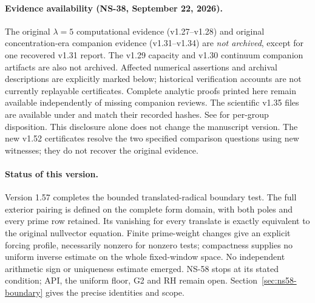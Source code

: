 \documentclass[11pt]{article}
\theoremstyle{remark}
\begin{document}
\begin{abstract}
experiment is inexpensive, but a bounded shift retains the exponential
cost of the present scalar far comparison. No cofinal floor follows.
Two precise meta-obstructions identify additional information that a
successful cofinal estimate must retain. The optimal full-distribution
mass-cap relaxation, and even the displayed mass/height/variation
relaxation, have divergent negative budgets for the actual symbol.
A separate domain-preserving unitary construction shows that exact
finite head and source-action data do not rescue a bound blind to
spectral orientation. These are scoped impossibility theorems, not a
claim that all recorded closures share one hypothesis.
Strong cancellation persists in the exact
source complement. Every complete eigenfunction has zero physical
endpoint. A cofinal complete-Weil lower error tending to zero would
imply RH directly, but remains unproved.
\end{abstract}
\paragraph{Evidence availability (NS-38, September 22, 2026).}
The original $\lambda=5$ computational evidence (v1.27--v1.28) and
original concentration-era companion evidence (v1.31--v1.34) are
\emph{not archived}, except for one recovered v1.31 report. The v1.29
capacity and v1.30 continuum companion artifacts are also not archived.
Affected numerical assertions and archival descriptions are explicitly
marked below; historical verification accounts are not currently
replayable certificates. Complete analytic proofs printed here remain
available independently of missing companion reviews. The scientific
v1.35 files are available under  and match their
recorded hashes. See  for per-group disposition.
This disclosure alone does not change the manuscript version. The new
v1.52 certificates resolve the two specified comparison questions using
new witnesses; they do not recover the original evidence.

\clearpage
\paragraph{Status of this version.}
Version 1.57 completes the bounded translated-radical boundary test.
The full exterior pairing is defined on the complete form domain, with
both poles and every prime row retained. Its vanishing for every translate
is exactly equivalent to the original nullvector equation. Finite
prime-weight changes give an explicit forcing profile, necessarily nonzero
for nonzero tests; compactness supplies no uniform inverse estimate on the
whole fixed-window space. No independent arithmetic sign or uniqueness
estimate emerged. NS-58 stops at its stated condition; API, the uniform
floor, G2 and RH remain open. Section~\ref{sec:ns58-boundary} gives the
precise identities and scope.
\end{document}
